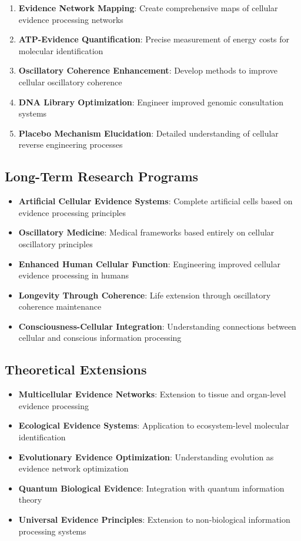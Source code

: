 \documentclass[12pt,a4paper]{article}
\begin{document}
{\begin{enumerate}
\item \textbf{Evidence Network Mapping}: Create comprehensive maps of cellular evidence processing networks
\item \textbf{ATP-Evidence Quantification}: Precise measurement of energy costs for molecular identification
\item \textbf{Oscillatory Coherence Enhancement}: Develop methods to improve cellular oscillatory coherence
\item \textbf{DNA Library Optimization}: Engineer improved genomic consultation systems
\item \textbf{Placebo Mechanism Elucidation}: Detailed understanding of cellular reverse engineering processes
\end{enumerate}

\subsection{Long-Term Research Programs}

\begin{itemize}
\item \textbf{Artificial Cellular Evidence Systems}: Complete artificial cells based on evidence processing principles
\item \textbf{Oscillatory Medicine}: Medical frameworks based entirely on cellular oscillatory principles
\item \textbf{Enhanced Human Cellular Function}: Engineering improved cellular evidence processing in humans
\item \textbf{Longevity Through Coherence}: Life extension through oscillatory coherence maintenance
\item \textbf{Consciousness-Cellular Integration}: Understanding connections between cellular and conscious information processing
\end{itemize}

\subsection{Theoretical Extensions}

\begin{itemize}
\item \textbf{Multicellular Evidence Networks}: Extension to tissue and organ-level evidence processing
\item \textbf{Ecological Evidence Systems}: Application to ecosystem-level molecular identification
\item \textbf{Evolutionary Evidence Optimization}: Understanding evolution as evidence network optimization
\item \textbf{Quantum Biological Evidence}: Integration with quantum information theory
\item \textbf{Universal Evidence Principles}: Extension to non-biological information processing systems
\end{itemize}

}
\end{document}

